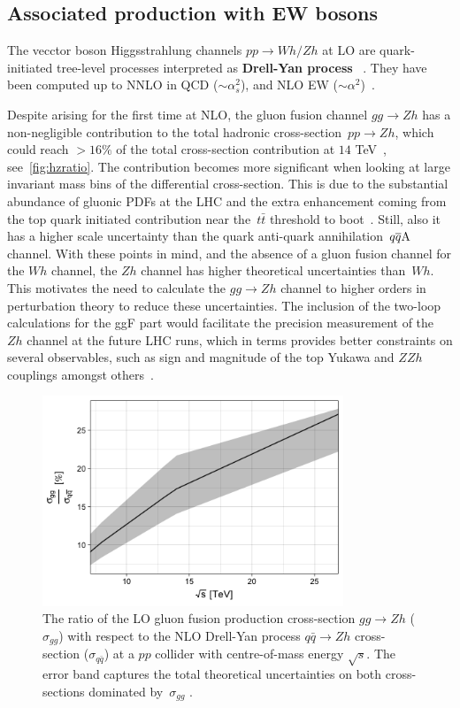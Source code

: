 \subsection{Associated production with EW bosons \label{vhproduction}}
The vecctor boson Higgsstrahlung channels $pp\to Wh/Zh$ at LO are quark-initiated tree-level processes  interpreted as \textbf{Drell-Yan process}~ \cite{Han:1991ia,Brein:2003wg}. They have been computed up to  NNLO in QCD ($\sim \alpha_s^2$), and  NLO  EW  ($\sim \alpha^2 $)~\cite{Amoroso:2020lgh}.
\par Despite arising for the first time at NLO, the gluon fusion channel $g g \rightarrow Zh$ has a non-negligible contribution to the total hadronic cross-section~$pp\to Zh$, which could reach $>16\%$ of the total cross-section contribution at $14$ TeV~\cite{Cepeda:2019klc}, see~\autoref{fig:hzratio}. The contribution becomes more significant when looking at large invariant mass bins of the differential cross-section. This is due to the substantial abundance of gluonic PDFs at the LHC and the extra enhancement coming from the top quark initiated contribution near the~$t\bar t$ threshold to boot~\cite{Englert:2013vua}. Still, also it has a higher scale uncertainty than the quark anti-quark annihilation~$q\overline q \rm A$ channel.  With these points in mind, and the absence of a gluon fusion channel for the $Wh$ channel, the $Zh$ channel has higher theoretical uncertainties than~$Wh$. This motivates the need to calculate the  $g g \rightarrow Z h$ channel to higher orders in perturbation theory to reduce these uncertainties. The inclusion of the two-loop calculations for the ggF part would facilitate the precision measurement of the $Zh$ channel at the future LHC runs, which in terms provides better constraints on several observables, such as sign and magnitude of the top Yukawa and $ZZh$ couplings amongst others~\cite{Englert:2016hvy}.
\begin{figure}
	\begin{center}
		\includegraphics[width=9cm]{./figures/Rplot}
		\caption{The ratio of the LO gluon fusion production cross-section $ gg \to Zh$  ($\sigma_{gg}$) with respect to the NLO Drell-Yan process $ q\bar{q} \to Zh$ cross-section ($\sigma_{q\bar{q}}$) at a $pp$ collider with centre-of-mass energy $\sqrt{s}$. The error band captures the total theoretical uncertainties on both cross-sections dominated by~$\sigma_{gg}$ .}
		\label{fig:hzratio}
	\end{center}
\end{figure}
